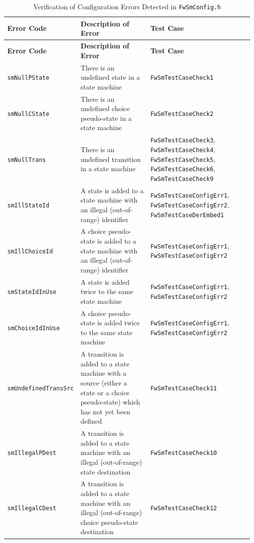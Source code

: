 \documentclass[a4paper,10pt]{article}
\begin{document}
\begin{longtable}{|p{3cm}|p{3.7cm}|p{4.5cm}|}
\caption{Verification of Configuration Errors Detected in \texttt{FwSmConfig.h}} \label{tab:SM_Config_Error}\\
\hline
\rowcolor{gray}
\textbf{Error Code} & \textbf{Description of Error} & \textbf{Test Case} \\
\hline
\endfirsthead
\rowcolor{gray}
\textbf{Error Code} & \textbf{Description of Error} & \textbf{Test Case} \\
\hline
\endhead
\texttt{smNullPState} & There is an undefined state in a state machine & 
\texttt{FwSmTestCaseCheck1} \\
\hline
\texttt{smNullCState} & There is an undefined choice pseudo-state in a state machine & \texttt{FwSmTestCaseCheck2} \\
\hline
\texttt{smNullTrans} & There is an undefined transition in a state machine & \texttt{FwSmTestCaseCheck3}, \texttt{FwSmTestCaseCheck4}, 
\texttt{FwSmTestCaseCheck5}, \texttt{FwSmTestCaseCheck6}, \texttt{FwSmTestCaseCheck9} \\
\hline
\texttt{smIllStateId} & A state is added to a state machine with an illegal (out-of-range) identifier & \texttt{FwSmTestCaseConfigErr1}, 
\texttt{FwSmTestCaseConfigErr2}, \texttt{FwSmTestCaseDerEmbed1} \\
\hline
\texttt{smIllChoiceId} & A choice pseudo-state is added to a state machine with an illegal (out-of-range) identifier & \texttt{FwSmTestCaseConfigErr1}, 
\texttt{FwSmTestCaseConfigErr2} \\
\hline
\texttt{smStateIdInUse} & A state is added twice to the same state machine & \texttt{FwSmTestCaseConfigErr1}, \texttt{FwSmTestCaseConfigErr2} \\
\hline
\texttt{smChoiceIdInUse} & A choice pseudo-state is added twice to the same state machine & \texttt{FwSmTestCaseConfigErr1}, \texttt{FwSmTestCaseConfigErr2} \\
\hline
\texttt{smUndefinedTransSrc} & A transition is added to a state machine with a source (either a state or a choice pseudo-state) 
which has not yet been defined & \texttt{FwSmTestCaseCheck11} \\
\hline
\texttt{smIllegalPDest} & A transition is added to a state machine with an illegal (out-of-range) state destination & \texttt{FwSmTestCaseCheck10} \\
\hline
\texttt{smIllegalCDest} & A transition is added to a state machine with an illegal (out-of-range) choice pseudo-state destination & \texttt{FwSmTestCaseCheck12} \\

\end{longtable}
\end{document}
